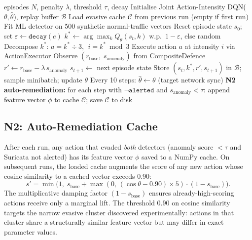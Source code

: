 \documentclass[sigconf]{acmart}
\begin{document}
\begin{algorithm}[t]
\caption{AATF Training Loop}
\label{alg:aatf}
\begin{algorithmic}[1]
\Require episodes $N$, penalty $\lambda$, threshold $\tau$, decay
\State Initialise Joint Action-Intensity DQN($\theta, \hat\theta$), replay buffer $\mathcal{B}$
\State Load evasive cache $\mathcal{C}$ from previous run (empty if first run)
\State Fit ML detector on 500 synthetic normal-traffic vectors
    \State Reset episode state $s_0$; set $\varepsilon \leftarrow \texttt{decay}(e)$
        \State $k^* \leftarrow \arg\max_k Q_\theta(s_t, k)$ w.p.\ $1{-}\varepsilon$, else random
        \State Decompose $k^*$: $a = k^* \div 3$, $\;i = k^* \bmod 3$
        \State Execute action $a$ at intensity $i$ via ActionExecutor
        \State Observe $(r_{\text{base}},\; s_{\text{anomaly}})$ from CompositeDefence
        \State $r' \leftarrow r_{\text{base}} - \lambda\, s_{\text{anomaly}}$ 
        \State $s_{t+1} \leftarrow$ next episode state
        \State Store $(s_t, k^*, r', s_{t+1})$ in $\mathcal{B}$; sample minibatch; update $\theta$
        \State Every 10 steps: $\hat\theta \leftarrow \theta$ (target network sync)
    \EndFor
\EndFor
\State \textbf{N2 auto-remediation:} for each step with $\neg\texttt{alerted}$ and $s_{\text{anomaly}} < \tau$:
\State \hspace{2em} append feature vector $\phi$ to cache $\mathcal{C}$; save $\mathcal{C}$ to disk
\end{algorithmic}
\end{algorithm}

\subsection{N2: Auto-Remediation Cache}
\label{sec:n2}

After each run, any action that evaded \emph{both} detectors (anomaly
score $< \tau$ and Suricata not alerted) has its feature vector $\phi$
saved to a NumPy cache. On subsequent runs, the loaded cache augments
the score of any new action whose cosine similarity to a cached vector
exceeds 0.90:
\begin{equation}
s' = \min\!\bigl(1,\; s_{\text{base}} + \max(0,\, (\cos\theta - 0.90)\!\times\!5)
                              \cdot (1 - s_{\text{base}})\bigr).
\label{eq:n2}
\end{equation}
The multiplicative damping factor $(1 - s_{\text{base}})$ ensures
already-high-scoring actions receive only a marginal lift. The threshold
0.90 on cosine similarity targets the narrow evasive cluster discovered
experimentally: actions in that cluster share a structurally similar
feature vector but may differ in exact parameter values.
\end{document}

